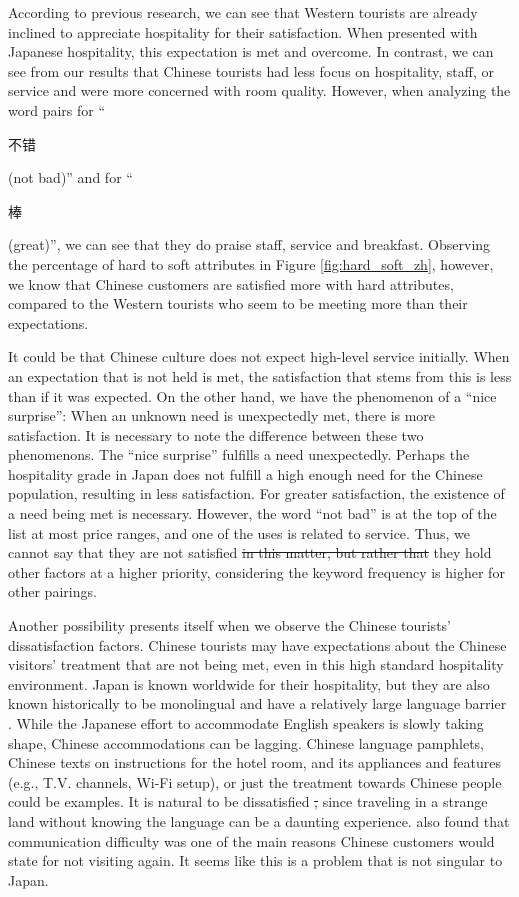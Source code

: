 \documentclass[smallextended,natbib]{svjour3}       %
\providecommand{\DIFadd}[1]{{\protect\color{blue}\uwave{#1}}} %
\providecommand{\DIFdel}[1]{{\protect\color{red}\sout{#1}}}                      %
\providecommand{\DIFaddbegin}{} %
\providecommand{\DIFaddend}{} %
\providecommand{\DIFdelbegin}{} %
\providecommand{\DIFdelend}{} %
\newcommand{\DIFscaledelfig}{0.5}
\newlength{\DIFdelgraphicswidth} %
\newlength{\DIFdelgraphicsheight} %
\newcommand{\DIFaddincludegraphics}[2][]{{\color{blue}\fbox{\DIFOincludegraphics[#1]{#2}}}} %
\newcommand{\DIFdelincludegraphics}[2][]{%
\sbox{\DIFdelgraphicsbox}{\DIFOincludegraphics[#1]{#2}}%
\settoboxwidth{\DIFdelgraphicswidth}{\DIFdelgraphicsbox} %
\settoboxtotalheight{\DIFdelgraphicsheight}{\DIFdelgraphicsbox} %
\scalebox{\DIFscaledelfig}{%
\parbox[b]{\DIFdelgraphicswidth}{\usebox{\DIFdelgraphicsbox}\\[-\baselineskip] \rule{\DIFdelgraphicswidth}{0em}}\llap{\resizebox{\DIFdelgraphicswidth}{\DIFdelgraphicsheight}{%
\setlength{\unitlength}{\DIFdelgraphicswidth}%
\begin{picture}(1,1)%
\thicklines\linethickness{2pt} %
{\color[rgb]{1,0,0}\put(0,0){\framebox(1,1){}}}%
{\color[rgb]{1,0,0}\put(0,0){\line( 1,1){1}}}%
{\color[rgb]{1,0,0}\put(0,1){\line(1,-1){1}}}%
\end{picture}%
}\hspace*{3pt}}} %
} %
\DeclareRobustCommand{\DIFaddbegin}{\DIFOaddbegin \let\includegraphics\DIFaddincludegraphics} %
\DeclareRobustCommand{\DIFaddend}{\DIFOaddend \let\includegraphics\DIFOincludegraphics} %
\DeclareRobustCommand{\DIFdelbegin}{\DIFOdelbegin \let\includegraphics\DIFdelincludegraphics} %
\DeclareRobustCommand{\DIFdelend}{\DIFOaddend \let\includegraphics\DIFOincludegraphics} %
\begin{document}
    According to previous research, we can see that Western tourists are already inclined to appreciate hospitality for their satisfaction. When presented with Japanese hospitality, this expectation is met and overcome. In contrast, we can see from our results that Chinese tourists had less focus on hospitality, staff, or service and were more concerned with room quality. However, when analyzing the word pairs for ``\begin{CJK}{UTF8}{gbsn}不错\end{CJK} (not bad)'' and for ``\begin{CJK}{UTF8}{gbsn}棒\end{CJK} (great)'', we can see that they do praise staff, service and breakfast. Observing the percentage of hard to soft attributes in Figure \ref{fig:hard_soft_zh}, however, we know that Chinese customers are satisfied more with hard attributes, compared to the Western tourists who seem to be meeting more than their expectations.

    It could be that Chinese culture does not expect high-level service initially. When an expectation that is not held is met, the satisfaction that stems from this is less than if it was expected. On the other hand, we have the phenomenon of a ``nice surprise'': When an unknown need is unexpectedly met, there is more satisfaction. It is necessary to note the difference between these two phenomenons. The ``nice surprise'' fulfills a need unexpectedly. Perhaps the hospitality grade in Japan does not fulfill a high enough need for the Chinese population, resulting in less satisfaction. For greater satisfaction, the existence of a need being met is necessary. However, the word ``not bad'' is at the top of the list at most price ranges, and one of the uses is related to service. Thus, we cannot say that they are not satisfied \DIFdelbegin \DIFdel{in this matter, but rather that }\DIFdelend \DIFaddbegin \DIFadd{with this matter. Rather, }\DIFaddend they hold other factors at a higher priority, considering the keyword frequency is higher for other pairings.

    Another possibility presents itself when we observe the Chinese tourists’ dissatisfaction factors. Chinese tourists may have expectations about the Chinese visitors' treatment that are not being met, even in this high standard hospitality environment. Japan is known worldwide for their hospitality, but they are also known historically to be monolingual and have a relatively large language barrier \cite[][]{heinrich2012making,coulmas2002japan}. While the Japanese effort to accommodate English speakers is slowly taking shape, Chinese accommodations can be lagging. Chinese language pamphlets, Chinese texts on instructions for the hotel room, and its appliances and features (e.g., T.V. channels, Wi-Fi setup), or just the treatment towards Chinese people could be examples. It is natural to be dissatisfied \DIFdelbegin \DIFdel{, }\DIFdelend since traveling in a strange land without knowing the language can be a daunting experience. \cite{ryan2001} also found that communication difficulty was one of the main reasons Chinese customers would state for not visiting again. It seems like this is a problem that is not singular to Japan.
\end{document}
